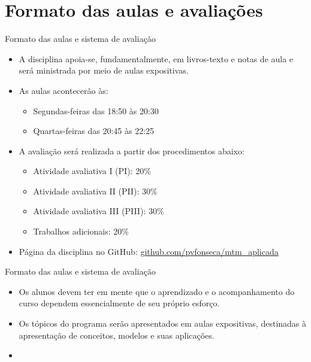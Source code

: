 \documentclass[10pt]{beamer}
\begin{document}
\section{Formato das aulas e avaliações}
\begin{frame}{Formato das aulas e sistema de avaliação}
    \begin{itemize}
        \item A disciplina apoia-se, fundamentalmente, em livros-texto e notas de aula e será ministrada por meio de aulas expositivas.\bigskip

        \item As aulas acontecerão às:
              \begin{itemize}
                  \item Segundas-feiras das 18:50 às 20:30
                  \item Quartas-feiras das 20:45 às 22:25\bigskip
              \end{itemize}

        \item A avaliação será realizada a partir dos procedimentos abaixo:
              \begin{itemize}
                  \item Atividade avaliativa I (PI): 20\%
                  \item Atividade avaliativa II (PII): 30\%
                  \item Atividade avaliativa III (PIII): 30\%
                  \item Trabalhos adicionais: 20\%\bigskip
              \end{itemize}

        \item Página da disciplina no GitHub: \href{https://github.com/pvfonseca/mtm\_aplicada}{github.com/pvfonseca/mtm\_aplicada}
    \end{itemize}
\end{frame}

\begin{frame}{Formato das aulas e sistema de avaliação}
    \begin{itemize}
        \item Os alunos devem ter em mente que o aprendizado e o acompanhamento do curso dependem essencialmente de seu próprio esforço.\bigskip

        \item Os tópicos do programa serão apresentados em aulas expositivas, destinadas à apresentação de conceitos, modelos e suas aplicações.\bigskip

        \item[\emoji{warning}] 
    \end{itemize}

\end{frame}
\end{document}
